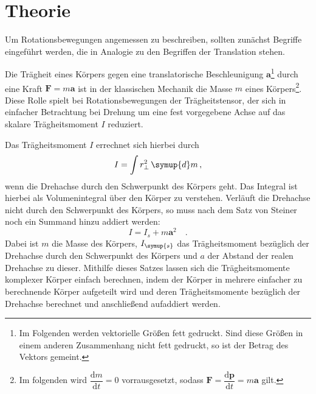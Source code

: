 \section{Theorie}
\label{sec:Theorie}

Um Rotationsbewegungen angemessen zu beschreiben, sollten zunächst Begriffe
eingeführt werden, die in Analogie zu den Begriffen der Translation stehen.

Die Trägheit eines Körpers gegen eine translatorische Beschleunigung $\symbf{a}$\footnote
{Im Folgenden werden vektorielle Größen fett gedruckt. Sind diese Größen in einem
anderen Zusammenhang nicht fett gedruckt, so ist der Betrag des Vektors gemeint.}
durch eine Kraft $\symbf{F}=m\symbf{a}$ ist in der klassischen Mechanik die
Masse $m$ eines Körpers\footnote{Im folgenden wird
$\dfrac{\mathrm{d}m}{\mathrm{d}t}=0$ vorrausgesetzt, sodass
$\symbf{F}=\dfrac{\mathrm{d}\symbf{p}}{\mathrm{d}t}=m\symbf{a}$ gilt.}.
Diese Rolle spielt bei Rotationsbewegungen der Trägheitstensor, der sich in
einfacher Betrachtung bei Drehung um eine fest vorgegebene Achse auf das skalare
Trägheitsmoment $I$ reduziert.

Das Trägheitsmoment $I$ errechnet sich hierbei durch
\begin{equation}
  I=\int r_{\perp}^2 \,\symup{d}m\,,
  \label{eqn:traegheitallg}
\end{equation}
wenn die Drehachse durch den Schwerpunkt des Körpers geht. Das Integral ist hierbei
als Volumenintegral über den Körper zu verstehen. Verläuft die Drehachse nicht
durch den Schwerpunkt des Körpers, so muss nach dem Satz von Steiner noch ein
Summand hinzu addiert werden:
\begin{equation}
  I=I_s+m\symbf{a}^2\quad.
  \label{eqn:steiner}
\end{equation}
Dabei ist $m$ die Masse des Körpers, $I_{\symup{s}}$ das Trägheitsmoment bezüglich
der Drehachse durch den Schwerpunkt des Körpers und $a$ der Abstand der realen
Drehachse zu dieser. Mithilfe dieses Satzes lassen sich die Trägheitsmomente
komplexer Körper einfach berechnen, indem der Körper in mehrere einfacher zu berechnende
Körper aufgeteilt wird und deren Trägheitsmomente bezüglich der Drehachse berechnet
und anschließend aufaddiert werden.

